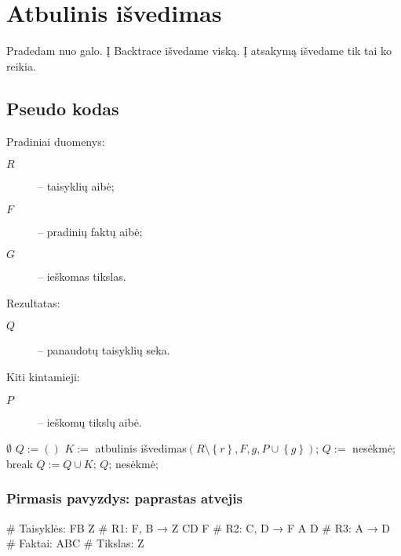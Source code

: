 \chapter{Atbulinis išvedimas}

Pradedam nuo galo. Į Backtrace išvedame viską. Į atsakymą išvedame tik tai
ko reikia.

\section{Pseudo kodas}

\label{sec:bc:pseudo}

Pradiniai duomenys:
\begin{description}
  \item[$R$] – taisyklių aibė;
  \item[$F$] – pradinių faktų aibė;
  \item[$G$] – ieškomas tikslas.
\end{description}

Rezultatas:
\begin{description}
  \item[$Q$] – panaudotų taisyklių seka.
\end{description}

Kiti kintamieji:
\begin{description}
  \item[$P$] – ieškomų tikslų aibė.
\end{description}

\begin{algorithmic}[1]
      \State \Return $\emptyset$
    \Else
        \State $Q := \left( \right)$
          \State $K := $ atbulinis išvedimas$(%
            R\setminus \left\{ r \right\}, F, g,%
            P \cup \left\{ g \right\})$;
            \State $Q :=$ nesėkmė;
            \State break
          \Else
            \State $Q := Q \cup K$;
          \EndIf
            \State \Return $Q$;
          \EndIf
        \EndFor
      \EndFor
      \State \Return nesėkmė;
    \EndIf
  \EndFunction
\end{algorithmic}

\subsection{Pirmasis pavyzdys: paprastas atvejis}

\begin{pythonaienv}[bc]
# Taisyklės:
FB Z                                    # R1: F, B → Z
CD F                                    # R2: C, D → F
A D                                     # R3: A → D
# Faktai:
ABC
# Tikslas:
Z
\end{pythonaienv}
